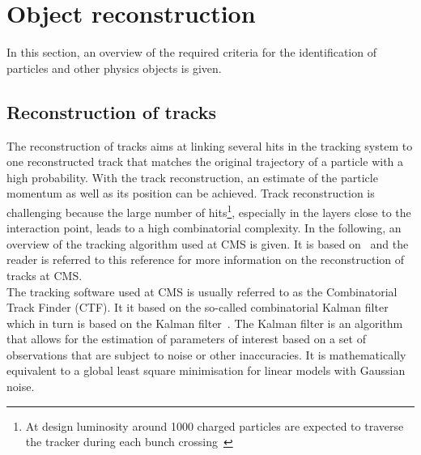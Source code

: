 \section{Object reconstruction}
\label{sec:ObjectReconstruction}
In this section, an overview of the required criteria for the identification of particles and other physics objects is given.

\subsection{Reconstruction of tracks}
\label{subsec:TrackReconstruction}
The reconstruction of tracks aims at linking several hits in the tracking system to one reconstructed track that matches the original trajectory of a particle with a high probability.
With the track reconstruction, an estimate of the particle momentum as well as its position can be achieved.
Track reconstruction is challenging because the large number of hits\footnote{At design luminosity around 1000 charged particles are expected to traverse the tracker during each bunch crossing~\cite{bib:CMS:tracking_8TeV}}, especially in the layers close to the interaction point, leads to a high combinatorial complexity. 
In the following, an overview of the tracking algorithm used at CMS is given.
It is based on~\cite{bib:CMS:tracking_8TeV} and the reader is referred to this reference for more information on the reconstruction of tracks at CMS.\\

The tracking software used at CMS is usually referred to as the Combinatorial Track Finder (CTF).
It it based on the so-called combinatorial Kalman filter~\cite{bib:TrackAlgorithm_1989,bib:TrackAlgorithm_1990,bib:TrackAlgorithm_1997} which in turn is based on the Kalman filter~\cite{bib:KalmanFilter_1987}.
The Kalman filter is an algorithm that allows for the estimation of parameters of interest based on a set of observations that are subject to noise or other inaccuracies.
It is mathematically equivalent to a global least square minimisation for linear models with Gaussian noise.

